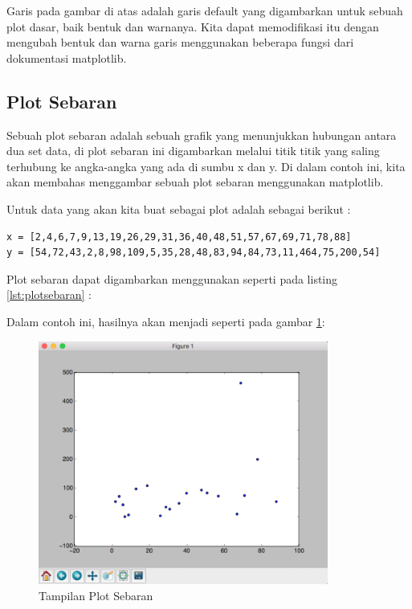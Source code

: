 Garis pada gambar di atas adalah garis default yang digambarkan untuk sebuah plot dasar, baik bentuk dan warnanya. Kita dapat memodifikasi itu dengan mengubah bentuk dan warna garis menggunakan beberapa fungsi dari dokumentasi matplotlib.

\subsection{Plot Sebaran}
Sebuah plot sebaran adalah sebuah grafik yang menunjukkan hubungan antara dua set data, di plot sebaran ini digambarkan melalui titik titik yang saling terhubung ke angka-angka yang ada di sumbu x dan y. Di dalam contoh ini, kita akan membahas menggambar sebuah plot sebaran menggunakan matplotlib.

Untuk data yang akan kita buat sebagai plot adalah sebagai berikut : 
\begin{verbatim}
x = [2,4,6,7,9,13,19,26,29,31,36,40,48,51,57,67,69,71,78,88]
y = [54,72,43,2,8,98,109,5,35,28,48,83,94,84,73,11,464,75,200,54]
\end{verbatim}
Plot sebaran dapat digambarkan menggunakan seperti pada listing \ref{lst:plotsebaran} : 


Dalam contoh ini, hasilnya akan menjadi seperti pada gambar \ref{fig:plotsebaran}:
\begin{figure}[!htbp]
	\centerline{\includegraphics[width=0.85\textwidth]{figures/6/plotsebaran.PNG}}
	\caption{Tampilan Plot Sebaran}
	\label{fig:plotsebaran}
\end{figure}

